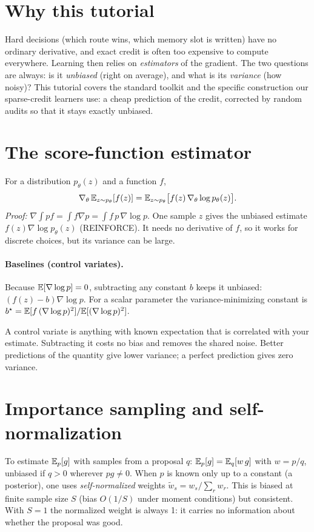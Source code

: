 \documentclass[11pt]{article}
\begin{document}

\section*{Why this tutorial}
Hard decisions (which route wins, which memory slot is written) have no ordinary derivative, and exact credit is often too
expensive to compute everywhere. Learning then relies on \emph{estimators} of the gradient. The two questions are always:
is it \emph{unbiased} (right on average), and what is its \emph{variance} (how noisy)? This tutorial covers the standard toolkit
and the specific construction our sparse-credit learners use: a cheap prediction of the credit, corrected by random audits so
that it stays exactly unbiased.

\section{The score-function estimator}
For a distribution $p_\theta(z)$ and a function $f$,
\[
\nabla_\theta\,\mathbb{E}_{z\sim p_\theta}[f(z)]=\mathbb{E}_{z\sim p_\theta}\big[f(z)\,\nabla_\theta\log p_\theta(z)\big].
\]
\emph{Proof:} $\nabla\!\int p f=\int f\nabla p=\int f\,p\,\nabla\log p$. One sample $z$ gives the unbiased estimate
$f(z)\nabla\log p_\theta(z)$ (REINFORCE). It needs no derivative of $f$, so it works for discrete choices, but its variance can be large.

\paragraph{Baselines (control variates).} Because $\mathbb{E}[\nabla\log p]=0$, subtracting any constant $b$ keeps it unbiased:
$(f(z)-b)\nabla\log p$. For a scalar parameter the variance-minimizing constant is
$b^\star=\mathbb{E}[f\,(\nabla\log p)^2]/\mathbb{E}[(\nabla\log p)^2]$.
\begin{keyidea}
A control variate is anything with known expectation that is correlated with your estimate. Subtracting it costs no bias and
removes the shared noise. Better predictions of the quantity give lower variance; a perfect prediction gives zero variance.
\end{keyidea}

\section{Importance sampling and self-normalization}
To estimate $\mathbb{E}_p[g]$ with samples from a proposal $q$: $\mathbb{E}_p[g]=\mathbb{E}_q[w\,g]$ with $w=p/q$, unbiased if $q>0$ wherever $pg\ne0$.
When $p$ is known only up to a constant (a posterior), one uses \emph{self-normalized} weights $\tilde w_s=w_s/\sum_r w_r$.
This is biased at finite sample size $S$ (bias $O(1/S)$ under moment conditions) but consistent. With $S=1$ the normalized
weight is always 1: it carries no information about whether the proposal was good.
\end{document}
